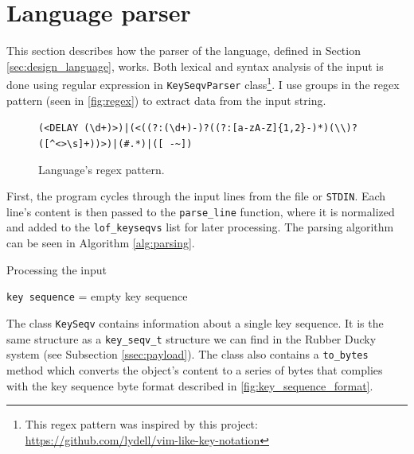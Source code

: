 \section{Language parser}
\label{sec:implementation_parser}
This section describes how the parser of the language, defined in Section \ref{sec:design_language}, works. Both lexical and syntax analysis of the input is done using regular expression in \verb|KeySeqvParser| class\footnote{This regex pattern was inspired by this project: \url{https://github.com/lydell/vim-like-key-notation}}. I use groups in the regex pattern (seen in \autoref{fig:regex}) to extract data from the input string.
\begin{figure}[ht]
\centering
\begin{varwidth}{\linewidth}
\footnotesize
\verb=(<DELAY (\d+)>)|(<((?:(\d+)-)?((?:[a-zA-Z]{1,2}-)*)(\\)?([^<>\s]+))>)|(#.*)|([ -~])=
\end{varwidth}
\caption{Language's regex pattern.}
\label{fig:regex}
\end{figure}
First, the program cycles through the input lines from the file or \verb|STDIN|. Each line's content is then passed to the \verb|parse_line| function, where it is normalized and added to the \verb|lof_keyseqvs| list for later processing. The parsing algorithm can be seen in Algorithm \ref{alg:parsing}.
\begin{algorithm}
\caption{Processing the input}
\label{alg:parsing}
\texttt{key sequence} = empty key sequence\;
\end{algorithm}

The class \verb|KeySeqv| contains information about a single key sequence. It is the same structure as a \verb|key_seqv_t| structure we can find in the Rubber Ducky system (see Subsection \ref{ssec:payload}). The class also contains a \verb|to_bytes| method which converts the object's content to a series of bytes that complies with the key sequence byte format described in \autoref{fig:key_sequence_format}.


